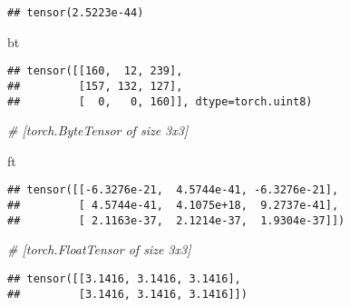 \documentclass[]{book}
\newenvironment{Shaded}{\begin{snugshade}}{\end{snugshade}}
\newcommand{\CommentTok}[1]{\textcolor[rgb]{0.56,0.35,0.01}{\textit{#1}}}
\newcommand{\FloatTok}[1]{\textcolor[rgb]{0.00,0.00,0.81}{#1}}
\newcommand{\KeywordTok}[1]{\textcolor[rgb]{0.13,0.29,0.53}{\textbf{#1}}}
\newcommand{\NormalTok}[1]{#1}
\newcommand{\OperatorTok}[1]{\textcolor[rgb]{0.81,0.36,0.00}{\textbf{#1}}}
\begin{document}
\begin{verbatim}
## tensor(2.5223e-44)
\end{verbatim}

\begin{Shaded}
\begin{Highlighting}[]
\NormalTok{bt}
\end{Highlighting}
\end{Shaded}

\begin{verbatim}
## tensor([[160,  12, 239],
##         [157, 132, 127],
##         [  0,   0, 160]], dtype=torch.uint8)
\end{verbatim}

\begin{Shaded}
\begin{Highlighting}[]
\CommentTok{# [torch.ByteTensor of size 3x3]}
\end{Highlighting}
\end{Shaded}

\begin{Shaded}
\begin{Highlighting}[]
\NormalTok{ft}
\end{Highlighting}
\end{Shaded}

\begin{verbatim}
## tensor([[-6.3276e-21,  4.5744e-41, -6.3276e-21],
##         [ 4.5744e-41,  4.1075e+18,  9.2737e-41],
##         [ 2.1163e-37,  2.1214e-37,  1.9304e-37]])
\end{verbatim}

\begin{Shaded}
\begin{Highlighting}[]
\CommentTok{# [torch.FloatTensor of size 3x3]}
\end{Highlighting}
\end{Shaded}

\begin{Shaded}
\end{Shaded}

\begin{verbatim}
## tensor([[3.1416, 3.1416, 3.1416],
##         [3.1416, 3.1416, 3.1416]])
\end{verbatim}
\end{document}
